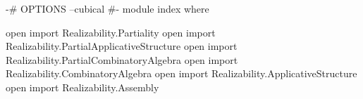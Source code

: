 {-# OPTIONS --cubical #-}
module index where

open import Realizability.Partiality
open import Realizability.PartialApplicativeStructure
open import Realizability.PartialCombinatoryAlgebra
open import Realizability.CombinatoryAlgebra
open import Realizability.ApplicativeStructure
open import Realizability.Assembly
